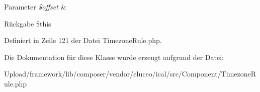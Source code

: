 \begin{DoxyParams}{Parameter}
{\em \$offset} & \\
\hline
\end{DoxyParams}
\begin{DoxyReturn}{Rückgabe}
\$this 
\end{DoxyReturn}


Definiert in Zeile 121 der Datei Timezone\+Rule.\+php.



Die Dokumentation für diese Klasse wurde erzeugt aufgrund der Datei\+:\begin{DoxyCompactItemize}
\item 
Upload/framework/lib/composer/vendor/eluceo/ical/src/\+Component/Timezone\+Rule.\+php\end{DoxyCompactItemize}

